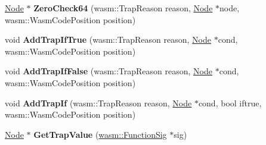 \begin{DoxyCompactItemize}
\item 
\hyperlink{classv8_1_1internal_1_1compiler_1_1_node}{Node} $\ast$ {\bfseries Zero\+Check64} (wasm\+::\+Trap\+Reason reason, \hyperlink{classv8_1_1internal_1_1compiler_1_1_node}{Node} $\ast$node, wasm\+::\+Wasm\+Code\+Position position)\hypertarget{classv8_1_1internal_1_1compiler_1_1_wasm_trap_helper_a2015a5da8b7e7a5f6ca8d53db1efe031}{}\label{classv8_1_1internal_1_1compiler_1_1_wasm_trap_helper_a2015a5da8b7e7a5f6ca8d53db1efe031}

\item 
void {\bfseries Add\+Trap\+If\+True} (wasm\+::\+Trap\+Reason reason, \hyperlink{classv8_1_1internal_1_1compiler_1_1_node}{Node} $\ast$cond, wasm\+::\+Wasm\+Code\+Position position)\hypertarget{classv8_1_1internal_1_1compiler_1_1_wasm_trap_helper_a903b6e638bb72bcbff88b69dc32489ea}{}\label{classv8_1_1internal_1_1compiler_1_1_wasm_trap_helper_a903b6e638bb72bcbff88b69dc32489ea}

\item 
void {\bfseries Add\+Trap\+If\+False} (wasm\+::\+Trap\+Reason reason, \hyperlink{classv8_1_1internal_1_1compiler_1_1_node}{Node} $\ast$cond, wasm\+::\+Wasm\+Code\+Position position)\hypertarget{classv8_1_1internal_1_1compiler_1_1_wasm_trap_helper_a06b15c5c9942f45a198289d73afd3251}{}\label{classv8_1_1internal_1_1compiler_1_1_wasm_trap_helper_a06b15c5c9942f45a198289d73afd3251}

\item 
void {\bfseries Add\+Trap\+If} (wasm\+::\+Trap\+Reason reason, \hyperlink{classv8_1_1internal_1_1compiler_1_1_node}{Node} $\ast$cond, bool iftrue, wasm\+::\+Wasm\+Code\+Position position)\hypertarget{classv8_1_1internal_1_1compiler_1_1_wasm_trap_helper_a98363bb80667c62a3bae8ea38953abf8}{}\label{classv8_1_1internal_1_1compiler_1_1_wasm_trap_helper_a98363bb80667c62a3bae8ea38953abf8}

\item 
\hyperlink{classv8_1_1internal_1_1compiler_1_1_node}{Node} $\ast$ {\bfseries Get\+Trap\+Value} (\hyperlink{classv8_1_1internal_1_1_signature}{wasm\+::\+Function\+Sig} $\ast$sig)\hypertarget{classv8_1_1internal_1_1compiler_1_1_wasm_trap_helper_a9d5ad165932b79dae675258bce574d68}{}\label{classv8_1_1internal_1_1compiler_1_1_wasm_trap_helper_a9d5ad165932b79dae675258bce574d68}

\end{DoxyCompactItemize}
